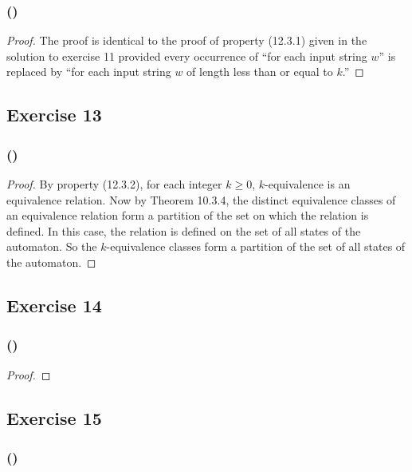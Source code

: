 \documentclass[14pt]{extarticle}
\begin{document}
\subsubsection{()}

\begin{proof}
The proof is identical to the proof of property (12.3.1) given in the solution to exercise 11 provided every occurrence of 
“for each input string \(w\)” is replaced by “for each input string \(w\) of length less than or equal to \(k\).”
\end{proof}

\subsection{Exercise 13}

\subsubsection{()}

\begin{proof}
By property (12.3.2), for each integer \(k \geq 0\), \(k\)-equivalence is an equivalence relation. Now by Theorem 10.3.4, 
the distinct equivalence classes of an equivalence relation form a partition of the set on which the relation is defined. 
In this case, the relation is defined on the set of all states of the automaton. So the \(k\)-equivalence classes form a 
partition of the set of all states of the automaton.
\end{proof}

\subsection{Exercise 14}

\subsubsection{()}

\begin{proof}

\end{proof}

\subsection{Exercise 15}

\subsubsection{()}
\end{document}

